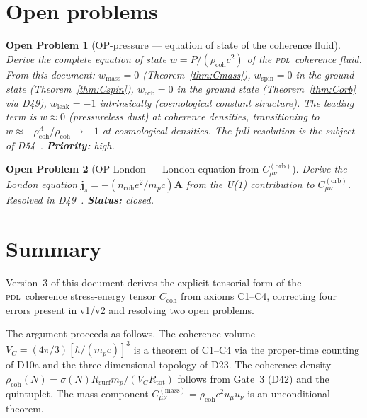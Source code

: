 \documentclass[12pt,a4paper]{article}
\newtheorem{openproblem}{Open Problem}
\newcommand{\hb}{\hbar}
\newcommand{\PDL}{\textsc{pdl}}
\newcommand{\Ccoh}{C_{\mathrm{coh}}}
\newcommand{\Cmass}{C^{(\mathrm{mass})}}
\newcommand{\Corb}{C^{(\mathrm{orb})}}
\newcommand{\rhocoh}{\rho_{\mathrm{coh}}}
\newcommand{\sig}{\sigma}
\newcommand{\Rsurf}{R_{\mathrm{surf}}}
\newcommand{\Rtot}{R_{\mathrm{tot}}}
\newcommand{\VC}{V_C}
\begin{document}
\section{Open problems}
\label{sec:open}

\begin{openproblem}[OP-pressure --- equation of state of the coherence fluid]
\label{op:pressure}
Derive the complete equation of state $w = P/(\rhocoh c^2)$ of the \PDL\ coherence fluid. From this document: $w_{\mathrm{mass}} = 0$ (Theorem~\ref{thm:Cmass}), $w_{\mathrm{spin}} = 0$ in the ground state (Theorem~\ref{thm:Cspin}), $w_{\mathrm{orb}} = 0$ in the ground state (Theorem~\ref{thm:Corb} via D49), $w_{\mathrm{leak}} = -1$ intrinsically (cosmological constant structure). The leading term is $w \approx 0$ (pressureless dust) at coherence densities, transitioning to $w \approx -\rhocoh^{\Lambda}/\rhocoh \to -1$ at cosmological densities. The full resolution is the subject of D54~\cite{PDL_D49_2026}. \textbf{Priority:} high.
\end{openproblem}

\begin{openproblem}[OP-London --- London equation from $\Corb_{\mu\nu}$]
\label{op:London}
Derive the London equation $\mathbf{j}_s = -(n_{\mathrm{coh}}e^2/m_p c)\mathbf{A}$ from the U(1) contribution to $\Corb_{\mu\nu}$. Resolved in D49~\cite{PDL_D49_2026}. \textbf{Status:} closed.
\end{openproblem}

\section{Summary}
\label{sec:summary}

Version~3 of this document derives the explicit tensorial form of the \PDL\ coherence stress-energy tensor $\Ccoh$ from axioms C1--C4, correcting four errors present in v1/v2 and resolving two open problems.

The argument proceeds as follows. The coherence volume $\VC = (4\pi/3)[\hb/(m_p c)]^3$ is a theorem of C1--C4 via the proper-time counting of D10a and the three-dimensional topology of D23. The coherence density $\rhocoh(N) = \sig(N)\Rsurf m_p/(\VC\Rtot)$ follows from Gate~3 (D42) and the quintuplet. The mass component $\Cmass_{\mu\nu} = \rhocoh c^2 u_\mu u_\nu$ is an unconditional theorem.
\end{document}
